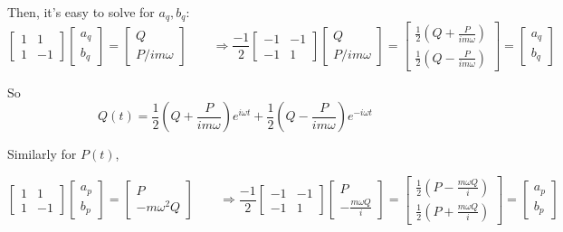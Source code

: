 \documentclass[twoside]{amsart}
\begin{document}
\begin{itemize}
Then, it's easy to solve for $a_q, b_q$:
\[
\left[ \begin{matrix} 1 & 1 \\ 1 & -1 \end{matrix} \right] \left[ \begin{matrix} a_q \\ b_q \end{matrix} \right] = \left[ \begin{matrix} Q \\ P/im\omega \end{matrix} \right] \quad \quad \Longrightarrow \frac{-1}{2} \left[ \begin{matrix}  -1 & -1  \\ -1 & 1 \end{matrix} \right] \left[ \begin{matrix} Q  \\ P/im \omega \end{matrix} \right] = \left[ \begin{matrix} \frac{1}{2} \left( Q + \frac{P}{ i m \omega} \right) \\ \frac{1}{2} \left( Q - \frac{P}{im\omega } \right) \end{matrix} \right] = \left[ \begin{matrix} a_q \\ b_q \end{matrix} \right]
\]

So
\[
\boxed{ Q(t) = \frac{1}{2} \left( Q + \frac{P}{im \omega} \right) e^{i\omega t} + \frac{1}{2} \left( Q - \frac{P}{im \omega } \right) e^{-i \omega t} }
\]

Similarly for $P(t)$,

\[
\left[ \begin{matrix} 1 & 1 \\ 1 & -1 \end{matrix} \right] \left[ \begin{matrix} a_p \\ b_p \end{matrix} \right] = \left[ \begin{matrix} P \\ -m\omega^2 Q \end{matrix} \right] \quad \quad \Longrightarrow \frac{-1}{2} \left[ \begin{matrix}  -1 & -1  \\ -1 & 1 \end{matrix} \right] \left[ \begin{matrix} P  \\ -\frac{m\omega Q}{i} \end{matrix} \right] = \left[ \begin{matrix} \frac{1}{2} \left( P - \frac{m \omega Q}{ i } \right) \\ \frac{1}{2} \left( P + \frac{m \omega Q}{i } \right) \end{matrix} \right] = \left[ \begin{matrix} a_p \\ b_p \end{matrix} \right]
\]


\end{itemize}
\end{document}
